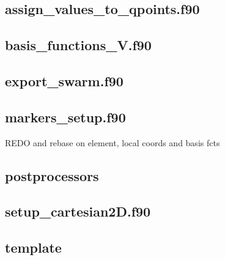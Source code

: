  \subsection{assign\_values\_to\_qpoints.f90}

 \subsection{basis\_functions\_V.f90}

 \subsection{export\_swarm.f90}

 \subsection{markers\_setup.f90}
 REDO and rebase on element, local coords and basis fcts
 \subsection{postprocessors}

 \subsection{setup\_cartesian2D.f90}
 
 \subsection{template}

